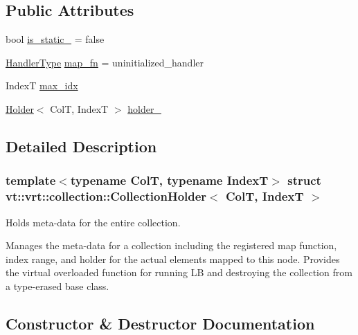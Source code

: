\subsection*{Public Attributes}
\begin{DoxyCompactItemize}
\item 
bool \hyperlink{structvt_1_1vrt_1_1collection_1_1_collection_holder_ab8d1f8570cd85775b2c8317255827dae}{is\+\_\+static\+\_\+} = false
\item 
\hyperlink{namespacevt_af64846b57dfcaf104da3ef6967917573}{Handler\+Type} \hyperlink{structvt_1_1vrt_1_1collection_1_1_collection_holder_a1bacbcdc0af1d6a69abf890304c78233}{map\+\_\+fn} = uninitialized\+\_\+handler
\item 
IndexT \hyperlink{structvt_1_1vrt_1_1collection_1_1_collection_holder_a1d6e15b6f578ae048c11c2c367651f00}{max\+\_\+idx}
\item 
\hyperlink{structvt_1_1vrt_1_1collection_1_1_holder}{Holder}$<$ ColT, IndexT $>$ \hyperlink{structvt_1_1vrt_1_1collection_1_1_collection_holder_ae553cc92f33cac4493cafd32b4350743}{holder\+\_\+}
\end{DoxyCompactItemize}


\subsection{Detailed Description}
\subsubsection*{template$<$typename ColT, typename IndexT$>$\newline
struct vt\+::vrt\+::collection\+::\+Collection\+Holder$<$ Col\+T, Index\+T $>$}

Holds meta-\/data for the entire collection. 

Manages the meta-\/data for a collection including the registered map function, index range, and holder for the actual elements mapped to this node. Provides the virtual overloaded function for running LB and destroying the collection from a type-\/erased base class. 

\subsection{Constructor \& Destructor Documentation}
\mbox{\label{structvt_1_1vrt_1_1collection_1_1_collection_holder_a75bb95393ac580b3f330da43e295a47a}} 
